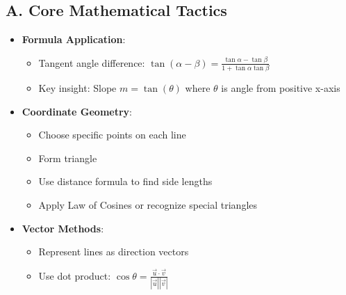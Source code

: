 \documentclass[12pt]{article}
\begin{document}
\begin{tacticalbox}
\subsection*{A. Core Mathematical Tactics}
\begin{itemize}[leftmargin=*]
    \item \textbf{Formula Application}: 
    \begin{itemize}
        \item Tangent angle difference: $\tan(\alpha - \beta) = \frac{\tan\alpha - \tan\beta}{1 + \tan\alpha\tan\beta}$
        \item Key insight: Slope $m = \tan(\theta)$ where $\theta$ is angle from positive x-axis
    \end{itemize}
    \item \textbf{Coordinate Geometry}: 
    \begin{itemize}
        \item Choose specific points on each line
        \item Form triangle
        \item Use distance formula to find side lengths
        \item Apply Law of Cosines or recognize special triangles
    \end{itemize}
    \item \textbf{Vector Methods}: 
    \begin{itemize}
        \item Represent lines as direction vectors
        \item Use dot product: $\cos\theta = \frac{\vec{u} \cdot \vec{v}}{|\vec{u}||\vec{v}|}$
    \end{itemize}
\end{itemize}


\end{tacticalbox}
\end{document}
